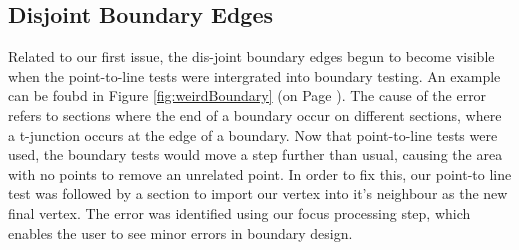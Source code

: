 \subsection{Disjoint Boundary Edges}
Related to our first issue, the dis-joint boundary edges begun to become visible when the point-to-line tests were intergrated into boundary testing. An example can be foubd in Figure \ref{fig:weirdBoundary} (on Page \pageref{fig:weirdBoundary}). The cause of the error refers to sections where the end of a boundary occur on different sections, where a t-junction occurs at the edge of a boundary. Now that point-to-line tests were used, the boundary tests would move a step further than usual, causing the area with no points to remove an unrelated point. In order to fix this, our point-to line test was followed by a section to import our vertex into it's neighbour as the new final vertex. The error was identified using our focus processing step, which enables the user to see minor errors in boundary design.

